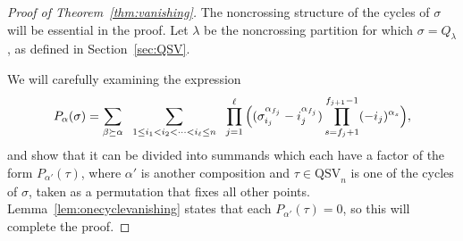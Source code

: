 \documentclass[12pt]{amsart}
\theoremstyle{definition}
\theoremstyle{remark}
\numberwithin{equation}{section}
\newcommand{\QSV}{\mathrm{QSV}}
\begin{document}
\begin{proof}[Proof of Theorem~\ref{thm:vanishing}]
The noncrossing structure of the cycles of $\sigma$ will be essential in the proof.  
Let $\lambda$ be the noncrossing partition for which $\sigma = Q_{\lambda}$, as defined in Section~\ref{sec:QSV}.  

We will carefully examining the expression
\[
P_{\alpha}(\sigma) =  
\sum_{\beta \succeq \alpha}
\hspace{0.6em}
\sum_{1\le i_{1} < i_{2} < \cdots < i_{\ell} \le n} 
\hspace{0.6em}
\prod_{j = 1}^{\ell}
\Big(
(\sigma_{i_{j}}^{\alpha_{f_{j}}} - i_{j}^{\alpha_{f_{j}}}) 
\prod_{s = f_{j} + 1}^{f_{j+1} - 1} (- i_{j})^{\alpha_{s}}
\Big),
\]
and show that it can be divided into summands which each have a factor of the form $P_{\alpha'}(\tau)$, where $\alpha'$ is another composition and $\tau \in \QSV_{n}$ is one of the cycles of $\sigma$, taken as a permutation that fixes all other points.  Lemma~\ref{lem:onecyclevanishing} states that each $P_{\alpha'}(\tau) = 0$, so this will complete the proof.



\end{proof}
\end{document}

